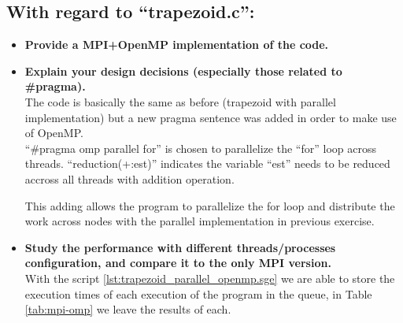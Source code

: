 \documentclass[11pt]{article}
\begin{document}
\subsection*{With regard to “trapezoid.c”:}
\begin{itemize}
    \item \textbf{Provide a MPI+OpenMP implementation of the code.}
    
    
    
    \item \textbf{Explain your design decisions (especially those related to \#pragma).}\\
    The code is basically the same as before (trapezoid with parallel implementation) but a new pragma sentence was added in order to make use of OpenMP.\\
    ``\#pragma omp parallel for'' is chosen to parallelize the ``for'' loop across threads. ``reduction(+:est)'' indicates the variable ``est'' needs to be reduced accross all threads with addition operation.
    
    This adding allows the program to parallelize the for loop and distribute the work across nodes with the parallel implementation in previous exercise.
    \item \textbf{Study the performance with different threads/processes configuration, and compare it to the only MPI version.}\\
    With the script \ref{lst:trapezoid_parallel_openmp.sge} we are able to store the execution times of each execution of the program in the queue, in Table \ref{tab:mpi-omp} we leave the results of each.
\end{itemize}
\end{document}
